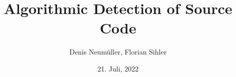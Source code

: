 \documentclass[a3paper, protrait, ngerman]{uulm-cs-poster}
\title{Algorithmic Detection of Source Code}
\author{Denis Neumüller, Florian Sihler}
\date{21. Juli, 2022}
\begin{document}
\maketitle
\lipsum[2]
\begin{multicols}{3}
   \lipsum
\end{multicols}
\lipsum[2]
\begin{multicols}{4}
   \lipsum[2-3]
\end{multicols}
\end{document}
